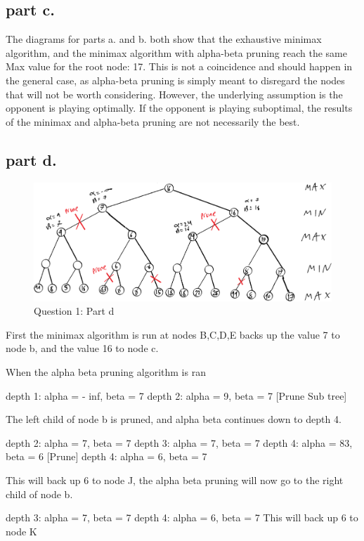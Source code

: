 \subsection{part c.}
The diagrams for parts a. and b. both show that the exhaustive minimax algorithm,
and the minimax algorithm with alpha-beta pruning reach the same Max value for the
root node: 17. This is not a coincidence and should happen in the general case, as
alpha-beta pruning is simply meant to disregard the nodes that will not be worth considering. However,
the underlying assumption is the opponent is playing optimally. If the opponent is playing suboptimal, the results of
the minimax and alpha-beta pruning are not necessarily the best.

\subsection{part d.}

\begin{figure}[H]
	\centering
  \includegraphics[scale = 0.70]{q1_part_d.png}
	\caption{Question 1: Part d}
	\label{fig: Q1 Part d}
\end{figure}

First the minimax algorithm is run at nodes B,C,D,E backs up the value 7 to node b, and the value 16 to node c.

When the alpha beta pruning algorithm is ran

depth 1: alpha = - inf, beta = 7
depth 2: alpha = 9, beta = 7 [Prune Sub tree]

The left child of node b is pruned, and alpha beta continues down to depth 4.

depth 2: alpha = 7, beta = 7
depth 3: alpha = 7, beta = 7
depth 4: alpha = 83, beta = 6 [Prune]
depth 4: alpha = 6, beta = 7

This will back up 6 to node J, the alpha beta pruning will now go to the right child of
node b.

depth 3: alpha = 7, beta = 7
depth 4: alpha = 6, beta = 7
This will back up 6 to node K

